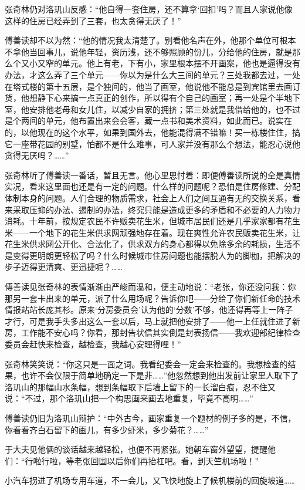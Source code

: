 \par 张奇林仍对洛玑山反感：“他自得一套住房，还不算拿‘回扣’吗？而且人家说他像这样的住房已经弄到了三套，也太贪得无厌了！”
\par 傅善读却不以为然：“他的情况我太清楚了。别看他名声在外，他那个单位可根本不拿他当回事儿，说他年轻，资历浅，还不够照顾的份儿，分给他的住房，就是那么个又小又窄的单元。他上有老，下有小，家里根本摆不开画案，他也是逼得没有办法，才这么弄了三个单元——你以为是什么大三间的单元？三处我都去过，一处在塔式楼的第十五层，是个独间的，他当了画室，他说他不能总是到宾馆里去画订货，他想静下心来搞一点真正的创作，所以得有个自己的画室；再一处是个半地下室，他安排他老母和女儿住，以减少自家的拥挤；第三处就是我借给他的，也不过是个两间的单元，他布置出来会会客，藏一点书和美术资料，如此而已。说实在的，以他现在的这个水平，如果到国外去，他能混得满不错嘛！买一栋楼住住，搞它一座带花园的别墅，怕都不是什么难事，可人家并没有那么个想法，能忍心说他贪得无厌吗？……”
\par 张奇林听了傅善读一番话，暂且无言。他心里思忖着：即便傅善读所说的全是真情实况，看来这里面也还是有一定的问题。什么样的问题呢？恐怕是住房修建、分配体制本身的问题。人们合理的物质需求，社会上人们之间互通有无的交换关系，看来采取压抑的办法、遏制的办法，终究只能是造成更多的矛盾和不必要的人力物力消耗。十年前，按规定农民不许贩卖花生米，但城市居民们还是几乎家家都有花生米——一个地下的花生米供求网顽强地存在着。现在爽性允许农民贩卖花生米，让花生米供求网公开化、合法化了，供求双方的身心都得以免除多余的耗损，生活不是变得更明朗更轻松了吗？什么时候城市住房问题也能摆脱人为的脚枷，把解决的步子迈得更清爽、更迅捷呢？……
\par 傅善读见张奇林的表情渐渐由严峻而温和，便主动地说：“老张，你还没问我：你那另一套卡出来的单元，派了什么用场呢？告诉你吧——分给了你们新任命的技术情报站站长庞其杉。原来‘分房委员会’认为他的‘分数’不够，他还得再等上一阵子才行，可是我手头多出这么一套以后，马上就把他安排了——他一上任就住进了新房，工作能不安心吗？你看，那封告状信其实倒是封表扬信——我欢迎部纪律检查委员会赶快来检查，越检查，我越心安理得哩！”
\par 张奇林笑笑说：“你这只是一面之词。我看纪委会一定会来检查的。我想检查的结果，也许不会仅限于简单地确定一下是非……”他忽然想到他出发前让家里人取下了洛玑山的那幅山水条幅，想到条幅取下后墙上留下的一长溜白痕，忍不住又说：“不过，那个洛玑山把一个构思画来画去地重复，毕竟不高明……”
\par 傅善读仍旧为洛玑山辩护：“中外古今，画家重复一个题材的例子多的是，不信，你看看齐白石留下的画儿，有多少虾米，多少菊花？……”
\par 于大夫见他俩的谈话越来越轻松，也便不再紧张。她朝车窗外望望，提醒他们：“行啦行啦，等老张回国以后你们再抬杠吧。看，到天竺机场啦！”
\par 小汽车拐进了机场专用车道，不一会儿，又飞快地旋上了候机楼前的回旋坡道……





